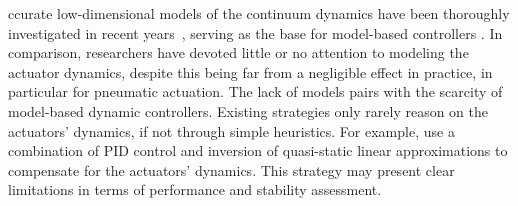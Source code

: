 ccurate low-dimensional models of the continuum dynamics have been thoroughly investigated in recent years~\citep{faure2012sofa, grazioso2019geometrically, sadati2021tmtdyn}, serving as the base for model-based controllers \citep{boyer2020dynamics, della2023model}. 
In comparison, researchers have devoted little or no attention to modeling the actuator dynamics, despite this being far from a negligible effect in practice, in particular for pneumatic actuation. %
%
%
%
The lack of models pairs with the scarcity of model-based dynamic controllers. Existing strategies only rarely reason on the actuators' dynamics, if not through simple heuristics.
%
For example, \citep{marchese2016design, della2020model} use a combination of PID control and inversion of quasi-static linear approximations to compensate for the actuators' dynamics. %
%
This strategy may present clear limitations in terms of performance and stability assessment.
%
